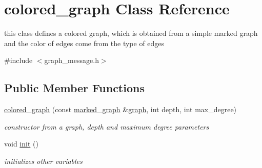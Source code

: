 \hypertarget{classcolored__graph}{}\section{colored\+\_\+graph Class Reference}
\label{classcolored__graph}


this class defines a colored graph, which is obtained from a simple marked graph and the color of edges come from the type of edges  




{\ttfamily \#include $<$graph\+\_\+message.\+h$>$}

\subsection*{Public Member Functions}
\begin{DoxyCompactItemize}
\item 
\hyperlink{classcolored__graph_a0374481a0474ac8e9b77689f74b5ed9b}{colored\+\_\+graph} (const \hyperlink{classmarked__graph}{marked\+\_\+graph} \&\hyperlink{classgraph}{graph}, int depth, int max\+\_\+degree)
\begin{DoxyCompactList}\small\item\em constructor from a graph, depth and maximum degree parameters \end{DoxyCompactList}\item 
void \hyperlink{classcolored__graph_a463f9f010d6124df8d03b4f7649a130d}{init} ()
\begin{DoxyCompactList}\small\item\em initializes other variables \end{DoxyCompactList}\end{DoxyCompactItemize}
